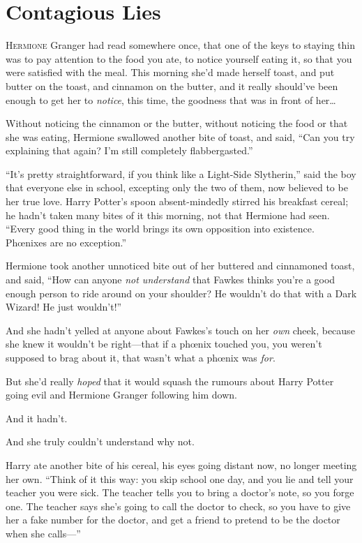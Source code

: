 \chapter{Contagious Lies}

\lettrine{H}{ermione} Granger had read somewhere once, that one of the keys to staying thin was to pay attention to the food you ate, to notice yourself eating it, so that you were satisfied with the meal. This morning she’d made herself toast, and put butter on the toast, and cinnamon on the butter, and it really should’ve been enough to get her to \emph{notice}, this time, the goodness that was in front of her…

Without noticing the cinnamon or the butter, without noticing the food or that she was eating, Hermione swallowed another bite of toast, and said, “Can you try explaining that again? I’m still completely flabbergasted.”

“It’s pretty straightforward, if you think like a Light-Side Slytherin,” said the boy that everyone else in school, excepting only the two of them, now believed to be her true love. Harry Potter’s spoon absent-mindedly stirred his breakfast cereal; he hadn’t taken many bites of it this morning, not that Hermione had seen. “Every good thing in the world brings its own opposition into existence. Phœnixes are no exception.”

Hermione took another unnoticed bite out of her buttered and cinnamoned toast, and said, “How can anyone \emph{not understand} that Fawkes thinks you’re a good enough person to ride around on your shoulder? He wouldn’t do that with a Dark Wizard! He just wouldn’t!”

And she hadn’t yelled at anyone about Fawkes’s touch on her \emph{own} cheek, because she knew it wouldn’t be right—that if a phœnix touched you, you weren’t supposed to brag about it, that wasn’t what a phœnix was \emph{for}.

But she’d really \emph{hoped} that it would squash the rumours about Harry Potter going evil and Hermione Granger following him down.

And it hadn’t.

And she truly couldn’t understand why not.

Harry ate another bite of his cereal, his eyes going distant now, no longer meeting her own. “Think of it this way: you skip school one day, and you lie and tell your teacher you were sick. The teacher tells you to bring a doctor’s note, so you forge one. The teacher says she’s going to call the doctor to check, so you have to give her a fake number for the doctor, and get a friend to pretend to be the doctor when she calls—”

